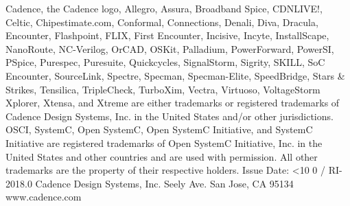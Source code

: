 \documentclass[twoside]{book}
\newcommand{\+}{\discretionary{\mbox{\scriptsize$\hookleftarrow$}}{}{}}
\newcommand{\clearemptydoublepage}{%
  \newpage{\pagestyle{empty}\cleardoublepage}%
}
\newcommand{\twodigits}[1]{%
  \ifnum#1<10 0#1\else #1\fi
}
\begin{document}
\begin{titlepage}
{\vspace*{0.2cm}
\newline Cadence, the Cadence logo, Allegro, Assura, Broadband Spice, CDNLIVE!, Celtic, Chipestimate.com, Conformal, Connections, Denali, Diva, Dracula, Encounter, Flashpoint, FLIX, First Encounter, Incisive, Incyte, InstallScape, NanoRoute, NC-Verilog, OrCAD, OSKit, Palladium, PowerForward, PowerSI, PSpice, Purespec, Puresuite, Quickcycles, SignalStorm, Sigrity, SKILL, SoC Encounter, SourceLink, Spectre, Specman, Specman-Elite, SpeedBridge, Stars \& Strikes, Tensilica, TripleCheck, TurboXim, Vectra, Virtuoso, VoltageStorm Xplorer, Xtensa, and Xtreme are either trademarks or registered trademarks of Cadence Design Systems, Inc. in the United States and/or other jurisdictions. 
OSCI, SystemC, Open SystemC, Open SystemC Initiative, and SystemC Initiative are registered trademarks of Open SystemC Initiative, Inc. in the United States and other countries and are used with permission. All other trademarks are the property of their respective holders.
\vspace*{2.5cm}
\newline Issue Date: \twodigits{\the\month}/{\the\year}
\newline RI-2018.0
\vspace*{0.4cm}
\newline
\vspace*{0.5cm}
\newline Cadence Design Systems, Inc.
 Seely Ave.
\newline San Jose, CA 95134
\newline www.cadence.com
}
\end{titlepage}
\clearemptydoublepage

{}
\tableofcontents
\clearemptydoublepage
{}
\listoftables
\clearemptydoublepage
{}
\listoffigures
\clearemptydoublepage

\hypersetup{pageanchor=true}

\end{document}
